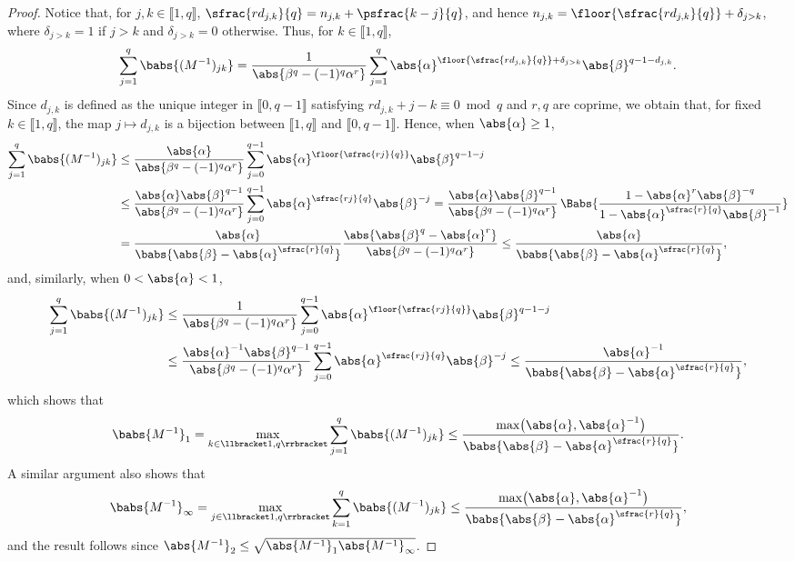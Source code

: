 \begin{proof}
Notice that, for $j, k \in \llbracket 1, q\rrbracket$, $\sfrac{r d_{j, k}}{q} = n_{j, k} + \psfrac{k-j}{q}$, and hence $n_{j, k} = \floor{\sfrac{r d_{j, k}}{q}} + \delta_{j > k}$, where $\delta_{j > k} = 1$ if $j > k$ and $\delta_{j > k} = 0$ otherwise. Thus, for $k \in \llbracket 1, q\rrbracket$,\vspace*{-3pt}
\[
\sum_{j=1}^q \babs{(M^{-1})_{jk}} = \frac{1}{\abs{\beta^q - (-1)^q \alpha^r}} \sum_{j=1}^q \abs{\alpha}^{\floor{\sfrac{r d_{j, k}}{q}} + \delta_{j > k}} \abs{\beta}^{q-1-d_{j, k}}.
\]
Since $d_{j, k}$ is defined as the unique integer in $\llbracket 0, q-1\rrbracket$ satisfying $r d_{j, k} + j - k \equiv 0 \bmod q$ and $r, q$ are coprime, we obtain that, for fixed $k \in \llbracket 1, q\rrbracket$, the map $j \mapsto d_{j, k}$ is a bijection between $\llbracket 1, q\rrbracket$ and $\llbracket 0, q-1\rrbracket$. Hence, when $\abs{\alpha} \geq 1$,\vspace*{-3pt}
\begin{align*}
\sum_{j=1}^q \babs{(M^{-1})_{jk}} & \leq \frac{\abs{\alpha}}{\abs{\beta^q - (-1)^q \alpha^r}} \sum_{j=0}^{q-1} \abs{\alpha}^{\floor{\sfrac{r j}{q}}} \abs{\beta}^{q-1-j}\\
&\leq \frac{\abs{\alpha} \abs{\beta}^{q-1}}{\abs{\beta^q - (-1)^q \alpha^r}} \sum_{j=0}^{q-1} \abs{\alpha}^{\sfrac{r j}{q}} \abs{\beta}^{-j} = \frac{\abs{\alpha} \abs{\beta}^{q-1}}{\abs{\beta^q - (-1)^q \alpha^r}}\, \Babs{\frac{1 - \abs{\alpha}^r \abs{\beta}^{-q}}{1 - \abs{\alpha}^{\sfrac{r}{q}} \abs{\beta}^{-1}}}\\
&= \frac{\abs{\alpha}}{\babs{\abs{\beta} - \abs{\alpha}^{\sfrac{r}{q}}}} \frac{\abs{\abs{\beta}^q - \abs{\alpha}^r}}{\abs{\beta^q - (-1)^q \alpha^r}} \leq \frac{\abs{\alpha}}{\babs{\abs{\beta} - \abs{\alpha}^{\sfrac{r}{q}}}},
\end{align*}
and, similarly, when $0 < \abs{\alpha} < 1$,
\begin{align*}
\sum_{j=1}^q \babs{(M^{-1})_{jk}} & \leq \frac{1}{\abs{\beta^q - (-1)^q \alpha^r}} \sum_{j=0}^{q-1} \abs{\alpha}^{\floor{\sfrac{r j}{q}}} \abs{\beta}^{q-1-j}\\
&\leq \frac{\abs{\alpha}^{-1} \abs{\beta}^{q-1}}{\abs{\beta^q - (-1)^q \alpha^r}} \sum_{j=0}^{q-1} \abs{\alpha}^{\sfrac{r j}{q}} \abs{\beta}^{-j}  \leq \frac{\abs{\alpha}^{-1}}{\babs{\abs{\beta} - \abs{\alpha}^{\sfrac{r}{q}}}},
\end{align*}
which shows that
\[
\babs{M^{-1}}_{1} = \max_{k \in \llbracket 1, q\rrbracket} \sum_{j=1}^q \babs{(M^{-1})_{jk}} \leq \frac{\max\bigl(\abs{\alpha}, \abs{\alpha}^{-1}\bigr)}{\babs{\abs{\beta} - \abs{\alpha}^{\sfrac{r}{q}}}}.
\]
A similar argument also shows that
\[
\babs{M^{-1}}_{\infty} = \max_{j \in \llbracket 1, q\rrbracket} \sum_{k=1}^q \babs{(M^{-1})_{jk}} \leq \frac{\max\bigl(\abs{\alpha}, \abs{\alpha}^{-1}\bigr)}{\babs{\abs{\beta} - \abs{\alpha}^{\sfrac{r}{q}}}},
\]
and the result follows since $\abs{M^{-1}}_{2} \leq \sqrt{\abs{M^{-1}}_{1} \abs{M^{-1}}_{\infty}}$.
\end{proof}

